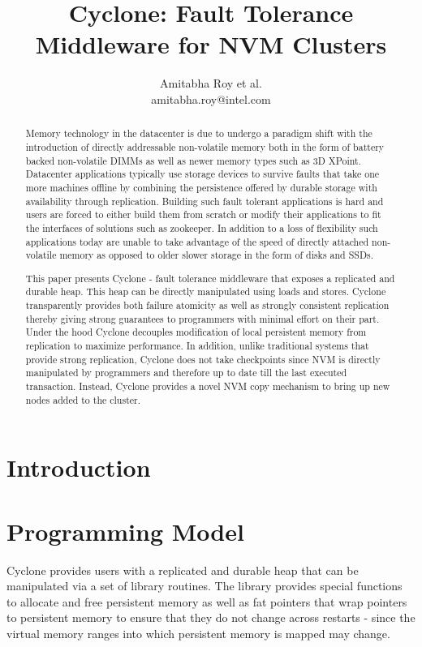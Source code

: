 \documentclass[twocolumn]{article}
\begin{document}
\title{Cyclone: Fault Tolerance Middleware for NVM Clusters}
\author{Amitabha Roy et al. \\ amitabha.roy@intel.com}
\maketitle
\begin{abstract}
Memory technology in the datacenter is due to undergo a paradigm shift with the
introduction of directly addressable non-volatile memory both in the form of
battery backed non-volatile DIMMs as well as newer memory types such as
3D XPoint. Datacenter applications typically use storage devices to survive
faults that take one more machines offline by combining the persistence offered by
durable storage with availability through replication. Building such fault
tolerant applications is hard and users are forced to either build
them from scratch or modify their applications to fit the interfaces of solutions
such as zookeeper. In addition to a loss of flexibility such applications today
are unable to take advantage of the speed of directly attached non-volatile
memory as opposed to older slower storage in the form of disks and SSDs.

This paper presents Cyclone - fault tolerance middleware that exposes a
replicated and durable heap. This heap can be directly manipulated using loads and
stores. Cyclone transparently provides both failure atomicity as well as
strongly consistent replication thereby giving strong guarantees to programmers
with minimal effort on their part. Under the hood Cyclone decouples modification
of local persistent memory from replication to maximize performance. In
addition, unlike traditional systems that provide strong replication, Cyclone
does not take checkpoints since NVM is directly manipulated by programmers and
therefore up to date till the last executed transaction. Instead, Cyclone
provides a novel NVM copy mechanism to bring up new nodes added to the cluster.
\end{abstract}  

\section{Introduction}

\section{Programming Model}
Cyclone provides users with a replicated and durable heap that can be
manipulated via a set of library routines. The library provides special
functions to allocate and free persistent memory as well as fat pointers that
wrap pointers to persistent memory to ensure that they do not change across
restarts - since the virtual memory ranges into which persistent memory is
mapped may change.
\end{document}
